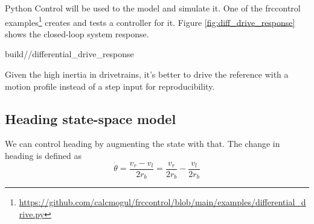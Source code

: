 Python Control will be used to  the
\gls{model} and simulate it. One of the frccontrol
examples\footnote{\url{https://github.com/calcmogul/frccontrol/blob/main/examples/differential_drive.py}}
creates and tests a controller for it. Figure \ref{fig:diff_drive_response}
shows the closed-loop \gls{system} response.
\begin{svg}{build/\chapterpath/differential_drive_response}
  \caption{Drivetrain response}
  \label{fig:diff_drive_response}
\end{svg}

Given the high inertia in drivetrains, it's better to drive the \gls{reference}
with a motion profile instead of a \gls{step input} for reproducibility.

\subsection{Heading state-space model}

We can control heading by augmenting the state with that. The change in heading
is defined as
\begin{equation*}
  \dot{\theta} = \frac{v_r - v_l}{2r_b} = \frac{v_r}{2r_b} - \frac{v_l}{2r_b}
\end{equation*}

